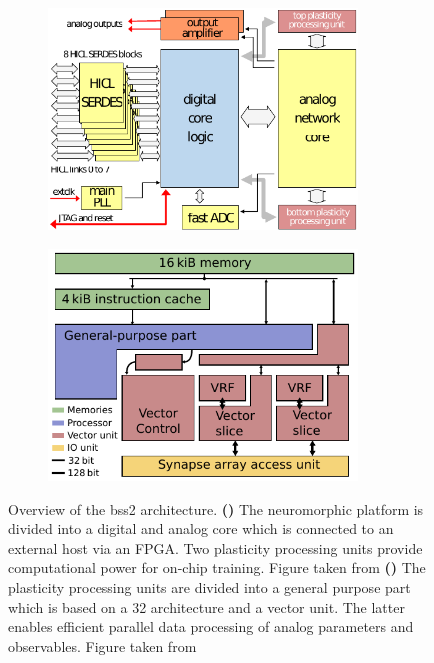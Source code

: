 \begin{figure}
	\begin{subfigure}[c]{0.5\textwidth}
		\centering
		\caption{}
		\includegraphics[width=0.9\textwidth]{figures/bss2architecture_wtext.pdf}
		\label{hxstructure}
	\end{subfigure}	
	\begin{subfigure}[c]{0.5\textwidth}
		\centering
		\caption{}
		\includegraphics[width=0.9\textwidth]{figures/ppu_overview.pdf}
		\label{hxppu}
	\end{subfigure}
	\caption[Overview of the \gls{bss2} architecture.]{Overview of the \gls{bss2} architecture. \textbf{()} The neuromorphic platform is divided into a digital and analog core which is connected to an external host via an FPGA. Two plasticity processing units provide computational power for on-chip training.  Figure taken from \citealp{schemmel2017internal} \textbf{()} The plasticity processing units are divided into a general purpose part which is based on a \SI{32}{\bit} architecture and a vector unit. The latter enables efficient parallel data processing of analog parameters and observables. Figure taken from \cite{friedmann2016hybridlearning}}
\end{figure}

